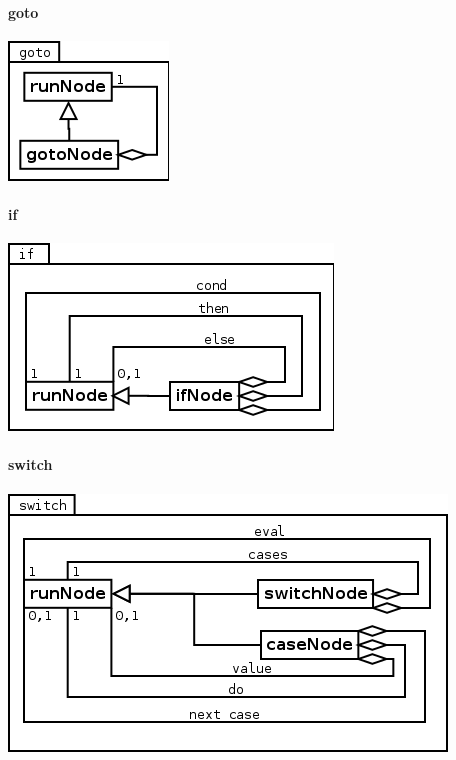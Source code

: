 \paragraph{goto}
\begin{center}
\includegraphics[scale=0.4]{goto.png} \\
\end{center}

\paragraph{if}
\begin{center}
\includegraphics[scale=0.4]{if.png} \\
\end{center}

\paragraph{switch}
\begin{center}
\includegraphics[scale=0.4]{switch.png} \\
\end{center}

